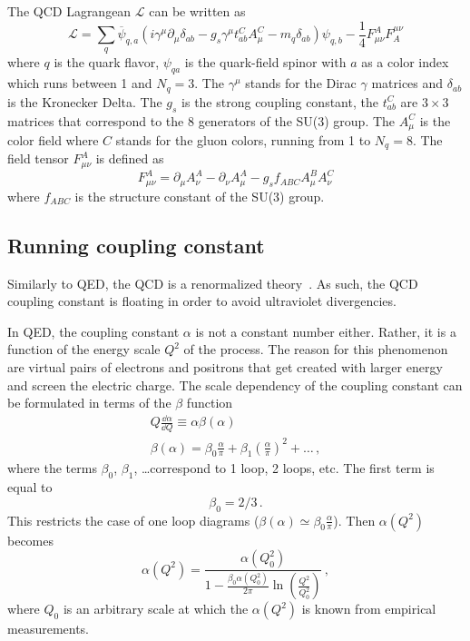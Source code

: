 The QCD Lagrangean $\mathcal{L}$ can be written as
\begin{equation}
 \mathcal{L} = \sum_{q}\overline{\psi}_{q,a}(i\gamma^\mu \partial_\mu \delta_{ab} - g_s \gamma^\mu t_{ab}^CA_\mu^C - m_q\delta_{ab})\psi_{q,b} - \frac{1}{4}F_{\mu\nu}^AF^{\mu\nu}_A
\end{equation}
where $q$ is the quark flavor, $\psi_{qa}$ is the quark-field spinor with $a$ as a color index which runs between 1 and $N_q = 3$\@. The $\gamma^\mu$ stands for the Dirac $\gamma$ matrices and $\delta_{ab}$ is the Kronecker Delta. The $g_s$ is the strong coupling constant, the $t_{ab}^C$ are $3\times3$ matrices that correspond to the 8 generators of the SU(3) group. The $A_\mu^C$ is the color field where $C$ stands for the gluon colors, running from 1 to $N_q=8$\@. The field tensor $F^A_{\mu\nu}$ is defined as
\begin{equation}
 F_{\mu\nu}^A = \partial_\mu A^A_\nu - \partial_\nu A^A_\mu - g_s f_{ABC} A^B_\mu A_\nu^C
\end{equation}
where $f_{ABC}$ is the structure constant of the SU(3) group.


\subsection{Running coupling constant}
Similarly to QED, the QCD is a renormalized theory~\cite{renormalizationTHOOFT,renormalizationBOLLINI}\@. As such, the QCD coupling constant is floating in order to avoid ultraviolet divergencies.

In QED, the coupling constant $\alpha$ is not a constant number either. Rather, it is a function of the energy scale $Q^2$ of the process. The reason for this phenomenon are virtual pairs of electrons and positrons that get created with larger energy and screen the electric charge. The scale dependency of the coupling constant can be formulated in terms of the $\beta$ function 
\begin{equation}
\begin{gathered}
 Q\frac{\dd\alpha}{\dd Q} \equiv  \alpha\beta(\alpha) \\
 \beta(\alpha) =  \beta_0\frac{\alpha}{\pi} + \beta_1 \left(\frac{\alpha}{\pi}\right)^2 + \dots \,,
 \end{gathered}
\end{equation}
where the terms $\beta_0$, $\beta_1$, \dots correspond to 1 loop, 2 loops, etc. The first term is equal to
\begin{equation}
 \beta_0 = 2/3\,.
\end{equation}
This restricts the case of one loop diagrams ($\beta(\alpha)\simeq \beta_0\frac{\alpha}{\pi}$). Then $\alpha(Q^2)$ becomes
\begin{equation}
 \alpha(Q^2) =  \frac{\alpha (Q_0^2)}{1 - \frac{\beta_0 \alpha (Q_0^2)}{2\pi} \ln(\frac{Q^2}{Q_0^2})}\,,
\end{equation}
where $Q_0$ is an arbitrary scale at which the $\alpha(Q^2)$ is known from empirical measurements.

